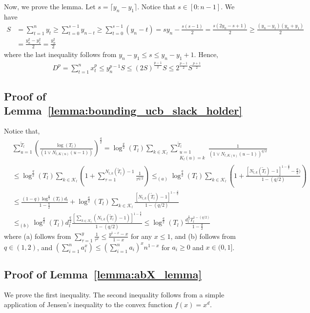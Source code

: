 \documentclass[12pt,draftcls, onecolumn]{IEEEtran}
\begin{document}
{Now, we prove the lemma. Let $s = \lceil y_n - y_1 \rceil$. Notice that $s \in [0:n-1]$. We have
\begin{align}
S &= \sum_{t=1}^n y_t \geq \sum_{t=0}^{s-1} y_{n-t} \geq \sum_{t=0}^{s-1} \left(y_{n}-t\right)  = sy_n - \frac{s(s-1)}{2} = \frac{s(2y_n-s+1)}{2} \geq \frac{(y_n-y_1)(y_n+y_1)}{2} \nonumber\\&= \frac{y_n^2 - y_1^2}{2} = \frac{y_n^2}{2} \nonumber
\end{align}
where the last inequality follows from $y_n -y_1 \leq s \leq y_n -y_1 +1$. Hence, 
\begin{align}
    D^p = \sum_{t=1}^n x_t^p \leq y_n^{p-1} S  \leq (2S)^{\frac{p-1}{2}}S \leq 2^{\frac{p-1}{2}}S^{\frac{p+1}{2}} \nonumber
\end{align}
\subsection{Proof of Lemma~\ref{lemma:bounding_ucb_slack_holder}}\label{app:bounding_ucb_slack_holder}
Notice that,
\begin{align}
&\sum_{u=1}^{\tilde{T}_l}\left(\frac{\log\left(T_l\right)}{(1 \vee N_{l,K(u)}(u-1))}\right)^{\frac{q}{2}} = \log^{\frac{q}{2}}(T_l)\sum_{k \in \mathcal{K}_l} \sum_{\substack{u=1\\K_l(u) = k}}^{\tilde{T}_l}\frac{1}{(1 \vee N_{l,K(u)}(u-1))^{q/2}}  \nonumber\\&\leq \log^{\frac{q}{2}}(T_l)\sum_{k \in \mathcal{K}_l} \left(1+\sum_{\tau = 1}^{N_{l,k}(\tilde{T}_l)-1}\frac{1}{\tau^{q/2}}\right) \leq_{(a)} \log^{\frac{q}{2}}(T_l)\sum_{k \in \mathcal{K}_l} \left(1+\frac{[N_{l,k}(\tilde{T}_l)-1]^{1-\frac{q}{2}}-\frac{q}{2})}{1-(q/2)}\right) \nonumber\\&\leq \frac{(1-q)\log^{\frac{q}{2}}(T_l)d_l}{1-\frac{q}{2}} +\log^{\frac{q}{2}}(T_l)\sum_{k \in \mathcal{K}_l}\frac{[N_{l,k}(\tilde{T}_l)-1]^{1-\frac{q}{2}}}{1-(q/2)}
\nonumber\\& \leq_{(b)} \log^{\frac{q}{2}}(T_l)d_l^{\frac{q}{2}}\frac{\left[\sum_{k \in \mathcal{K}_l}(N_{l,k}(\tilde{T}_l)-1)\right]^{1-\frac{q}{2}}}{1-(q/2)} \leq \log^{\frac{q}{2}}(T_l)\frac{d_l^{\frac{q}{2}}T_l^{1-(q/2)}}{1-\frac{q}{2}} \nonumber
\end{align}
where (a) follows from $\sum_{\tau = 1}^y \frac{1}{\tau^x} \leq \frac{y^{1-x}-x}{1-x}$ for any $x \leq 1$, and (b) follows from $q \in (1,2)$, and $\left(\sum_{i=1}^n a_i^x\right) \leq \left(\sum_{i=1}^n a_i\right)^xn^{1-x}$
for $a_i \geq 0$ and $x \in (0,1]$.
\subsection{Proof of Lemma~\ref{lemma:abX_lemma}}\label{app:abX_lemma}
We prove the first inequality. The second inequality follows from a simple application of Jensen's inequality to the convex function $f(x) = x^d$.

}
\end{document}
